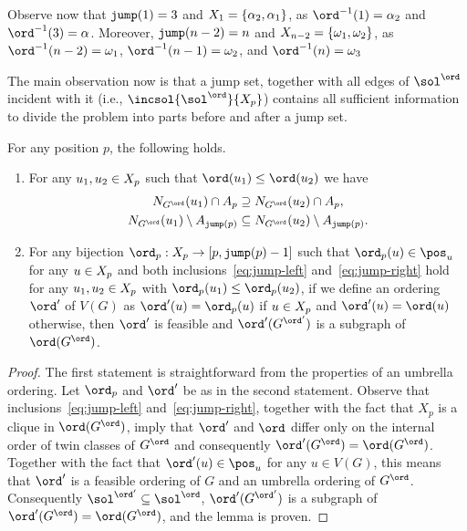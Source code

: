 Observe now that $\mathtt{jump}(1) = 3$ and $X_{1} = \{\alpha_2,\alpha_1\}$,
 as $\ord^{-1}(1) = \alpha_2$ and $\ord^{-1}(3) = \alpha$.
Moreover, $\mathtt{jump}(n-2) = n$ and $X_{n-2} = \{\omega_1,\omega_2\}$,
as $\ord^{-1}(n-2) = \omega_1$, $\ord^{-1}(n-1) = \omega_2$, and $\ord^{-1}(n) = \omega_3$

The main observation now is that a jump set, together with all edges of $\sol^\ord$
incident with it (i.e., $\incsol{\sol^\ord}{\jumpset{p}}$) contains
all sufficient information to divide the problem into parts before and after
a jump set.
\begin{lemma}\label{lem:jump-equiv}
For any position $p$, the following holds.
\begin{enumerate}
\item
For any $u_1,u_2 \in X_{p}$ such that $\ord(u_1) \leq \ord(u_2)$ we have
\begin{align}
N_{G^\ord}(u_1) \cap \secp{p} &\supseteq N_{G^\ord}(u_2) \cap \secp{p}, \label{eq:jump-left} \\
N_{G^\ord}(u_1) \setminus \secp{\jump{p}} &\subseteq N_{G^\ord}(u_2) \setminus \secp{\jump{p}}. \label{eq:jump-right}
\end{align}
\item For any bijection $\ord_p: \jumpset{p} \to [p,\jump{p}-1]$
such that $\ord_p(u) \in \pos_u$ for any $u \in X_{p}$ and 
both inclusions~\eqref{eq:jump-left} and~\eqref{eq:jump-right} hold
for any $u_1,u_2 \in X_{p}$ with $\ord_p(u_1)  \leq \ord_p(u_2)$,
if we define an ordering $\ord'$ of $V(G)$ as
$\ord'(u) = \ord_p(u)$ if $u \in X_{p}$ and $\ord'(u) = \ord(u)$ otherwise,
then $\ord'$ is feasible and $\ord'(G^{\ord'})$ is a subgraph of $\ord(G^\ord)$. 
\end{enumerate}
\end{lemma}
\begin{proof}
The first statement is straightforward from the properties of an umbrella ordering.
Let $\ord_p$ and $\ord'$ be as in the second statement.
Observe that inclusions~\eqref{eq:jump-left} and~\eqref{eq:jump-right}, together with the fact that $X_p$ is a clique in $\ord(G^\ord)$,
imply that $\ord'$ and $\ord$ differ only on the internal order of twin classes of $G^\ord$ and consequently $\ord'(G^\ord) = \ord(G^\ord)$.
Together with the fact that $\ord'(u)\in \pos_u$ for any $u\in V(G)$, this means that $\ord'$ is a feasible ordering of $G$ and an umbrella ordering of $G^\ord$.
Consequently $\sol^{\ord'} \subseteq \sol^\ord$, $\ord'(G^{\ord'})$ is a subgraph of $\ord'(G^\ord) = \ord(G^\ord)$, and the lemma is proven.
\end{proof}

